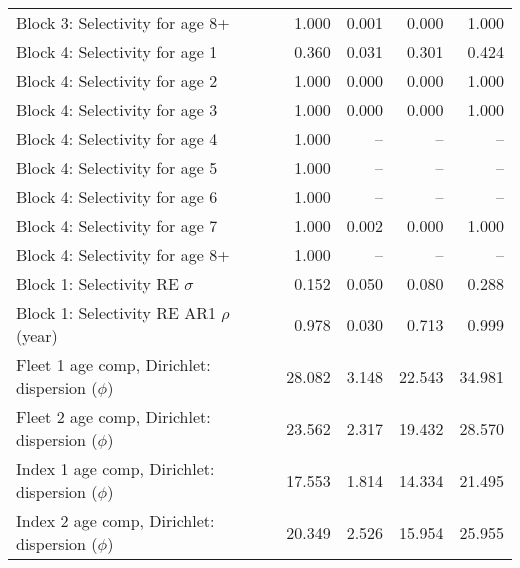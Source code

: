 \documentclass[
]{article}
\begin{document}
\begin{landscape}
\begin{longtable}[t]{lrrrr}
\addlinespace
Block 3: Selectivity for age 8+ & 1.000 & 0.001 & 0.000 & 1.000\\
Block 4: Selectivity for age 1 & 0.360 & 0.031 & 0.301 & 0.424\\
Block 4: Selectivity for age 2 & 1.000 & 0.000 & 0.000 & 1.000\\
Block 4: Selectivity for age 3 & 1.000 & 0.000 & 0.000 & 1.000\\
Block 4: Selectivity for age 4 & 1.000 & -- & -- & --\\
\addlinespace
Block 4: Selectivity for age 5 & 1.000 & -- & -- & --\\
Block 4: Selectivity for age 6 & 1.000 & -- & -- & --\\
Block 4: Selectivity for age 7 & 1.000 & 0.002 & 0.000 & 1.000\\
Block 4: Selectivity for age 8+ & 1.000 & -- & -- & --\\
Block 1: Selectivity RE $\sigma$ & 0.152 & 0.050 & 0.080 & 0.288\\
\addlinespace
Block 1: Selectivity RE AR1 $\rho$ (year) & 0.978 & 0.030 & 0.713 & 0.999\\
Fleet 1 age comp, Dirichlet: dispersion ($\phi$) & 28.082 & 3.148 & 22.543 & 34.981\\
Fleet 2 age comp, Dirichlet: dispersion ($\phi$) & 23.562 & 2.317 & 19.432 & 28.570\\
Index 1 age comp, Dirichlet: dispersion ($\phi$) & 17.553 & 1.814 & 14.334 & 21.495\\
Index 2 age comp, Dirichlet: dispersion ($\phi$) & 20.349 & 2.526 & 15.954 & 25.955\\*
\end{longtable}
\end{landscape}
\end{document}
